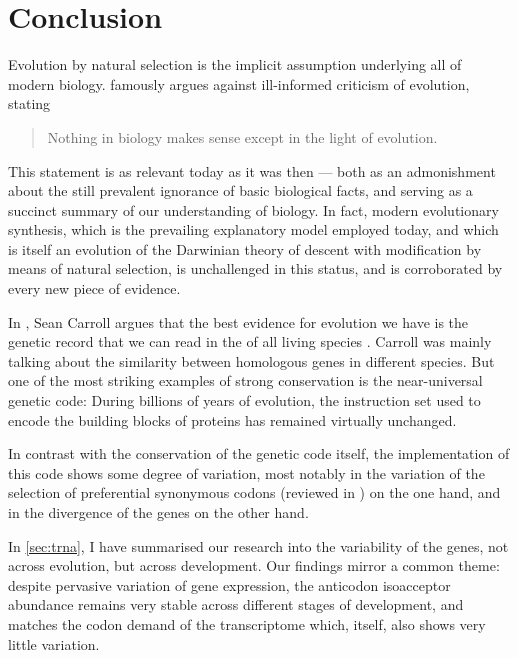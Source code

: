 \chapter{Conclusion}
\label{sec:conclusion}


\noindent
Evolution by natural selection is the implicit assumption underlying all of
modern biology. \citet{Dobzhansky:1973} famously argues against ill-informed
criticism of evolution, stating

\begin{quote}
    Nothing in biology makes sense except in the light of evolution.
\end{quote}

This statement is as relevant today as it was then --- both as an admonishment
about the still prevalent ignorance of basic biological facts, and serving as a
succinct summary of our understanding of biology. In fact, modern evolutionary
synthesis, which is the prevailing explanatory model employed today, and which
is itself an evolution of the Darwinian theory of descent with modification by
means of natural selection, is unchallenged in this status, and is corroborated
by every new piece of evidence.

In , Sean Carroll argues that the best
evidence for evolution we have is the genetic record that we can read in the
\dna of all living species \citep{Carroll:2006}. Carroll was mainly talking
about the similarity between homologous genes in different species. But one of
the most striking examples of strong conservation is the near-universal genetic
code: During billions of years of evolution, the instruction set used to encode
the building blocks of proteins has remained virtually unchanged.

In contrast with the conservation of the genetic code itself, the implementation
of this code shows some degree of variation, most notably in the variation of
the selection of preferential synonymous codons (reviewed in
\citet{Ermolaeva:2001}) on the one hand, and in the divergence of the \trna
genes \citep{Kutter:2011} on the other hand.

In \cref{sec:trna}, I have summarised our research into the variability of the
\trna genes, not across evolution, but across development. Our findings mirror a
common theme: despite pervasive variation of \trna gene expression, the
anticodon isoacceptor \trna abundance remains very stable across different
stages of development, and matches the codon demand of the transcriptome which,
itself, also shows very little variation.

